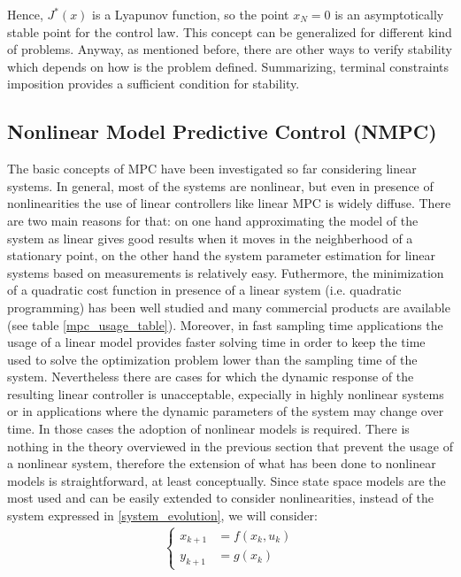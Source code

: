 Hence, $J^*(x)$ is a Lyapunov function, so the point $x_N=0$ is an asymptotically stable point for the control law. This concept can be generalized for different kind of problems. Anyway, as mentioned before, there are other ways to verify stability which depends on how is the problem defined. Summarizing, terminal constraints imposition provides a sufficient condition for stability.

\subsection{Nonlinear Model Predictive Control (NMPC)}

The basic concepts of MPC have been investigated so far considering linear systems. In general, most of the systems are nonlinear, but even in presence of nonlinearities the use of linear controllers like linear MPC is widely diffuse. There are two main reasons for that: on one hand approximating the model of the system as linear gives good results when it moves in the neighberhood of a stationary point, on the other hand the system parameter estimation for linear systems based on measurements is relatively easy. Futhermore, the minimization of a quadratic cost function in presence of a linear system (i.e. quadratic programming) has been well studied and many commercial products are available (see table \ref{mpc_usage_table}). Moreover, in fast sampling time applications the usage of a linear model provides faster solving time in order to keep the time used to solve the optimization problem lower than the sampling time of the system.
Nevertheless there are cases for which the dynamic response of the resulting linear controller is unacceptable, expecially in highly nonlinear systems or in applications where the dynamic parameters of the system may change over time. In those cases the adoption of nonlinear models is required. 
There is nothing in the theory overviewed in the previous section that prevent the usage of a nonlinear system, therefore the extension of what has been done to nonlinear models is straightforward, at least conceptually. Since state space models are the most used and can be easily extended to consider nonlinearities, instead of the system expressed in \ref{system_evolution}, we will consider:
\begin{equation}
\begin{split}
\begin{cases}
x_{k+1}&=f(x_k,u_k) \\
y_{k+1}&=g(x_k)
\end{cases}
\end{split}
\end{equation} 
